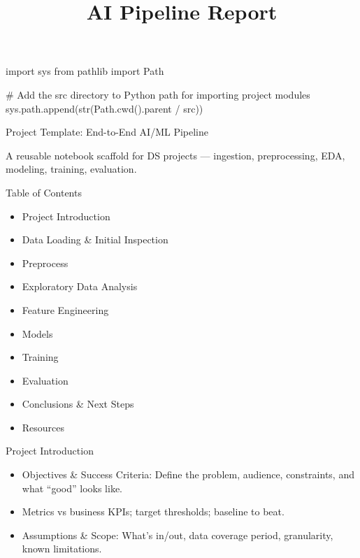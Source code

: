 \documentclass[
  letterpaper,
  DIV=11,
  numbers=noendperiod]{scrartcl}
\title{AI Pipeline Report}
\author{}
\date{}
\newenvironment{Shaded}{\begin{snugshade}}{\end{snugshade}}
\newcommand{\BuiltInTok}[1]{\textcolor[rgb]{0.00,0.23,0.31}{#1}}
\newcommand{\CommentTok}[1]{\textcolor[rgb]{0.37,0.37,0.37}{#1}}
\newcommand{\ImportTok}[1]{\textcolor[rgb]{0.00,0.46,0.62}{#1}}
\newcommand{\NormalTok}[1]{\textcolor[rgb]{0.00,0.23,0.31}{#1}}
\newcommand{\OperatorTok}[1]{\textcolor[rgb]{0.37,0.37,0.37}{#1}}
\newcommand{\StringTok}[1]{\textcolor[rgb]{0.13,0.47,0.30}{#1}}
\providecommand{\tightlist}{%
  \setlength{\itemsep}{0pt}\setlength{\parskip}{0pt}}
\renewenvironment{Shaded}{%
  \begin{tcolorbox}[%
    colback=codebg,%
    colframe=codebg,%
    borderline west={3pt}{0pt}{sectionblue},%
    boxrule=0pt,%
    arc=0pt,%
    boxsep=5pt,%
    left=2mm,%
    right=2mm,%
    top=2mm,%
    bottom=2mm%
  ]%
}{%
  \end{tcolorbox}%
}
\renewcommand*\contentsname{Table of contents}
\newcommand\contentsname{Table of contents}
\begin{document}
\maketitle

\renewcommand*\contentsname{Table of contents}
{
\hypersetup{linkcolor=}
\setcounter{tocdepth}{3}
\tableofcontents
}

\begin{Shaded}
\begin{Highlighting}[]
\ImportTok{import}\NormalTok{ sys}
\ImportTok{from}\NormalTok{ pathlib }\ImportTok{import}\NormalTok{ Path}

\CommentTok{\# Add the src directory to Python path for importing project modules}
\NormalTok{sys.path.append(}\BuiltInTok{str}\NormalTok{(Path.cwd().parent }\OperatorTok{/} \StringTok{\textquotesingle{}src\textquotesingle{}}\NormalTok{))}
\end{Highlighting}
\end{Shaded}

Project Template: End-to-End AI/ML Pipeline

A reusable notebook scaffold for DS projects --- ingestion,
preprocessing, EDA, modeling, training, evaluation.

Table of Contents

\begin{itemize}
\tightlist
\item
  Project Introduction
\item
  Data Loading \& Initial Inspection
\item
  Preprocess
\item
  Exploratory Data Analysis
\item
  Feature Engineering
\item
  Models
\item
  Training
\item
  Evaluation
\item
  Conclusions \& Next Steps
\item
  Resources
\end{itemize}

Project Introduction

\begin{itemize}
\tightlist
\item
  Objectives \& Success Criteria: Define the problem, audience,
  constraints, and what ``good'' looks like.
\item
  Metrics vs business KPIs; target thresholds; baseline to beat.
\item
  Assumptions \& Scope: What's in/out, data coverage period,
  granularity, known limitations.
\end{itemize}
\end{document}
